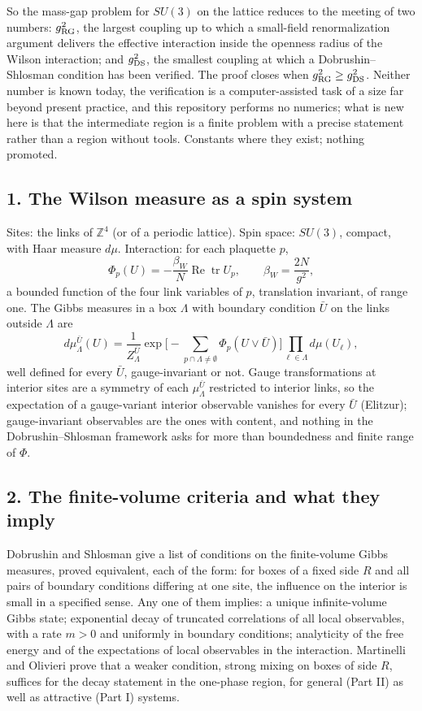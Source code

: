 \documentclass[11pt,a4paper]{article}
\begin{document}
So the mass-gap problem for \(SU(3)\) on the lattice reduces to the
meeting of two numbers: \(g_{\rm RG}^2\), the largest coupling up to
which a small-field renormalization argument delivers the effective
interaction inside the openness radius of the Wilson interaction; and
\(g_{\rm DS}^2\), the smallest coupling at which a Dobrushin--Shlosman
condition has been verified. The proof closes when
\(g_{\rm RG}^2\ge g_{\rm DS}^2\). Neither number is known today, the
verification is a computer-assisted task of a size far beyond present
practice, and this repository performs no numerics; what is new here is
that the intermediate region is a finite problem with a precise
statement rather than a region without tools. Constants where they
exist; nothing promoted.

\subsection{1. The Wilson measure as a spin
system}\label{the-wilson-measure-as-a-spin-system}

Sites: the links of \(\mathbb Z^4\) (or of a periodic lattice). Spin
space: \(SU(3)\), compact, with Haar measure \(d\mu\). Interaction: for
each plaquette \(p\),
\[\Phi_p(U)=-\frac{\beta_W}{N}\operatorname{Re}\operatorname{tr}U_p,\qquad\beta_W=\frac{2N}{g^2},\]
a bounded function of the four link variables of \(p\), translation
invariant, of range one. The Gibbs measures in a box \(\Lambda\) with
boundary condition \(\bar U\) on the links outside \(\Lambda\) are
\[d\mu_\Lambda^{\bar U}(U)=\frac{1}{Z_\Lambda^{\bar U}}\exp\Big[-\sum_{p\cap\Lambda\ne\emptyset}\Phi_p(U\vee\bar U)\Big]\prod_{\ell\in\Lambda}d\mu(U_\ell),\]
well defined for every \(\bar U\), gauge-invariant or not. Gauge
transformations at interior sites are a symmetry of each
\(\mu_\Lambda^{\bar U}\) restricted to interior links, so the
expectation of a gauge-variant interior observable vanishes for every
\(\bar U\) (Elitzur); gauge-invariant observables are the ones with
content, and nothing in the Dobrushin--Shlosman framework asks for more
than boundedness and finite range of \(\Phi\).

\subsection{2. The finite-volume criteria and what they
imply}\label{the-finite-volume-criteria-and-what-they-imply}

Dobrushin and Shlosman give a list of conditions on the finite-volume
Gibbs measures, proved equivalent, each of the form: for boxes of a
fixed side \(R\) and all pairs of boundary conditions differing at one
site, the influence on the interior is small in a specified sense. Any
one of them implies: a unique infinite-volume Gibbs state; exponential
decay of truncated correlations of all local observables, with a rate
\(m>0\) and uniformly in boundary conditions; analyticity of the free
energy and of the expectations of local observables in the interaction.
Martinelli and Olivieri prove that a weaker condition, strong mixing on
boxes of side \(R\), suffices for the decay statement in the one-phase
region, for general (Part II) as well as attractive (Part I) systems.
\end{document}
